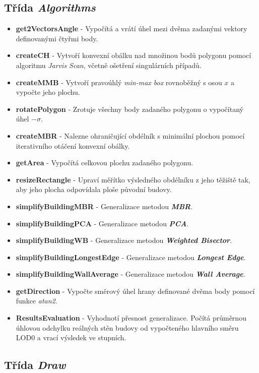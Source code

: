 \documentclass[12pt, a4paper]{article}
\begin{document}
\subsection{Třída \textit{Algorithms}}
\begin{itemize}
  \item \textbf{get2VectorsAngle} - Vypočítá a vrátí úhel mezi dvěma zadanými vektory definovanými čtyřmi body.
  \item \textbf{createCH} - Vytvoří konvexní obálku nad množinou bodů polygonu pomocí algoritmu \textit{Jarvis Scan}, včetně ošetření singulárních případů.
  \item \textbf{createMMB} - Vytvoří pravoúhlý \textit{min-max box} rovnoběžný s osou $x$ a vypočte jeho plochu.
  \item \textbf{rotatePolygon} - Zrotuje všechny body zadaného polygonu o vypočítaný úhel $-\sigma$.
  \item \textbf{createMBR} - Nalezne ohraničující obdélník s minimální plochou pomocí iterativního otáčení konvexní obálky.
  \item \textbf{getArea} - Vypočítá celkovou plochu zadaného polygonu.
  \item \textbf{resizeRectangle} - Upraví měřítko výsledného obdélníku z jeho těžiště tak, aby jeho plocha odpovídala ploše původní budovy.
  \item \textbf{simplifyBuildingMBR} - Generalizace metodou \textbf{\textit{MBR}}.
  \item \textbf{simplifyBuildingPCA} - Generalizace metodou \textbf{\textit{PCA}}.
  \item \textbf{simplifyBuildingWB} - Generalizace metodou \textbf{\textit{Weighted Bisector}}.
  \item \textbf{simplifyBuildingLongestEdge} - Generalizace metodou \textbf{\textit{Longest Edge}}.
   \item \textbf{simplifyBuildingWallAverage} - Generalizace metodou \textbf{\textit{Wall Average}}.
  \item \textbf{getDirection} - Vypočte směrový úhel hrany definované dvěma body pomocí funkce \textit{atan2}.
  \item \textbf{ResultsEvaluation} - Vyhodnotí přesnost generalizace. Počítá průměrnou úhlovou odchylku reálných stěn budovy od vypočteného hlavního směru LOD0 a vrací výsledek ve stupních.
\end{itemize}

\subsection{Třída \textit{Draw}}
\end{document}
